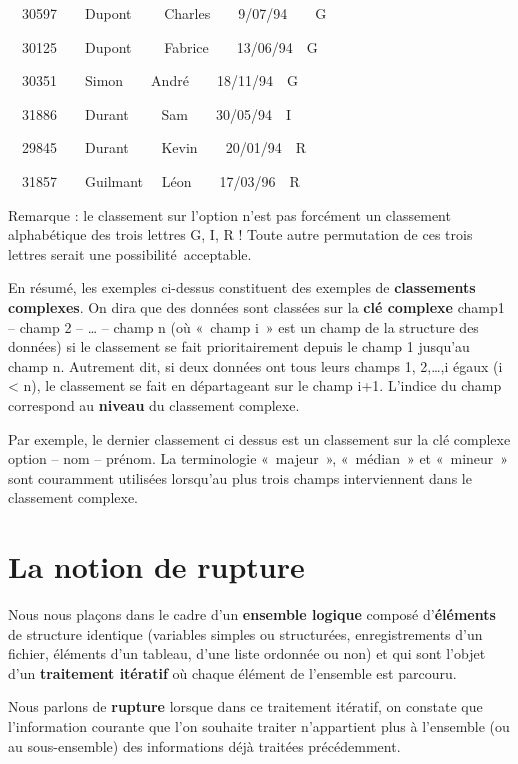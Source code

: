 {\sffamily
\ \ 30597\ \ \ \ Dupont \ \ \ \ Charles\ \ \ \ 9/07/94\ \ \ \ G}

{\sffamily
\ \ 30125\ \ \ \ Dupont \ \ \ \ Fabrice\ \ \ \ 13/06/94\ \ G}

{\sffamily
\ \ 30351\ \ \ \ Simon\ \ \ \ André\ \ \ \ 18/11/94\ \ G}

{\sffamily
\ \ 31886\ \ \ \ Durant \ \ \ \ Sam\ \ \ \ 30/05/94\ \ I}

{\sffamily
\ \ 29845\ \ \ \ Durant \ \ \ \ Kevin\ \ \ \ 20/01/94\ \ R}

{\sffamily
\ \ 31857\ \ \ \ Guilmant \ \ Léon\ \ \ \ 17/03/96\ \ R}

Remarque : le classement sur l’option n’est pas forcément un classement
alphabétique des trois lettres G, I, R ! Toute autre permutation de ces
trois lettres serait une possibilité~acceptable.

En résumé, les exemples ci-dessus constituent des exemples de
\textbf{classements complexes}. On dira que des données sont classées
sur la \textbf{clé complexe} champ1 – champ 2 – … – champ n (où «~champ
i~» est un champ de la structure des données) si le classement se fait
prioritairement depuis le champ 1 jusqu’au champ n. Autrement dit, si
deux données ont tous leurs champs 1, 2,…,i égaux (i {\textless} n), le
classement se fait en départageant sur le champ i+1. L’indice du champ
correspond au \textbf{niveau} du classement complexe.

Par exemple, le dernier classement ci dessus est un classement sur la
clé complexe option – nom – prénom. La terminologie «~majeur~»,
«~médian~» et «~mineur~» sont couramment utilisées lorsqu’au plus trois
champs interviennent dans le classement complexe.


\section{La notion de rupture}

Nous nous plaçons dans le cadre d’un \textbf{ensemble logique} composé
d’\textbf{éléments} de structure identique (variables simples ou
structurées, enregistrements d’un fichier, éléments d’un tableau, d’une
liste ordonnée ou non) et qui sont l’objet d’un \textbf{traitement
itératif} où chaque élément de l’ensemble est parcouru.

Nous parlons de \textbf{rupture} lorsque dans ce traitement itératif, on
constate que l’information courante que l’on souhaite traiter
n’appartient plus à l’ensemble (ou au sous-ensemble) des informations
déjà traitées précédemment.

